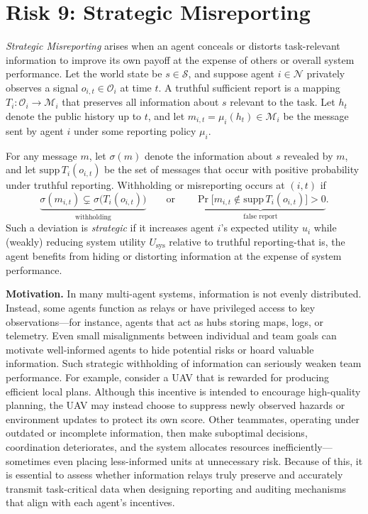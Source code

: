 \documentclass[11pt, letterpaper, shortlabels]{berkeley}
\begin{document}
{\section{Risk 9: Strategic Misreporting}
\label{sec:strategic-withholding}

\begin{boxE}
\textit{Strategic Misreporting} arises when an agent conceals or distorts
task-relevant information to improve its own payoff at the expense of others or overall system
performance. Let the world state be $s \in \mathcal{S}$, and suppose agent $i \in \mathcal{N}$ privately observes
a signal $o_{i,t} \in \mathcal{O}_i$ at time $t$. A truthful sufficient report is a mapping
$T_i : \mathcal{O}_i \to \mathcal{M}_i$ that preserves all information about $s$ relevant to the task.
Let $h_t$ denote the public history up to $t$, and let $m_{i,t} = \mu_i(h_t) \in \mathcal{M}_i$ be the
message sent by agent $i$ under some reporting policy $\mu_i$.

For any message $m$, let $\sigma(m)$ denote the information about $s$ revealed by $m$, and let
$\mathrm{supp}\,T_i(o_{i,t})$ be the set of messages that occur with positive probability under
truthful reporting. Withholding or misreporting occurs at $(i,t)$ if
\[
\underbrace{\sigma(m_{i,t}) \subsetneq \sigma\!\big(T_i(o_{i,t})\big)}_{\text{withholding}}
\qquad\text{or}\qquad
\underbrace{\Pr\!\big[m_{i,t} \notin \mathrm{supp}\,T_i(o_{i,t})\big] > 0}_{\text{false report}}.
\]
Such a deviation is \emph{strategic} if it increases agent $i$'s expected utility $u_i$ while (weakly)
reducing system utility $U_{\mathrm{sys}}$ relative to truthful reporting-that is, the agent benefits
from hiding or distorting information at the expense of system performance.
\end{boxE}



\textbf{Motivation.} In many multi-agent systems, information is not evenly distributed. Instead, some agents function as relays or have privileged access to key observations—for instance, agents that act as hubs storing maps, logs, or telemetry. Even small misalignments between individual and team goals can motivate well-informed agents to hide potential risks or hoard valuable information. Such strategic withholding of information can seriously weaken team performance. For example, consider a UAV that is rewarded for producing efficient local plans. Although this incentive is intended to encourage high-quality planning, the UAV may instead choose to suppress newly observed hazards or environment updates to protect its own score. Other teammates, operating under outdated or incomplete information, then make suboptimal decisions, coordination deteriorates, and the system allocates resources inefficiently—sometimes even placing less-informed units at unnecessary risk.
Because of this, it is essential to assess whether information relays truly preserve and accurately transmit task-critical data when designing reporting and auditing mechanisms that align with each agent’s incentives.

}
\end{document}
